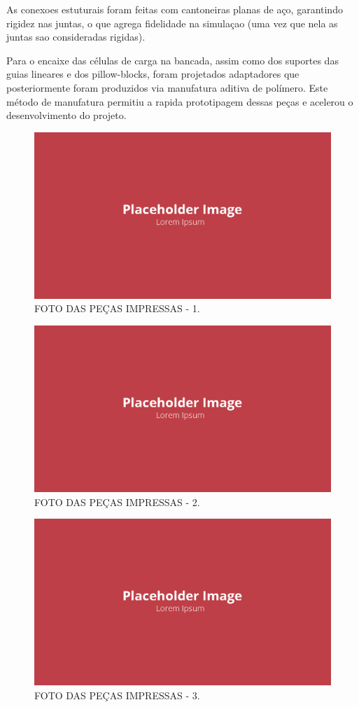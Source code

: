 As conexoes estuturais foram feitas com cantoneiras planas de aço, garantindo rigidez nas juntas, o que agrega fidelidade na simulaçao (uma vez que nela as juntas sao consideradas rigidas).

Para o encaixe das células de carga na bancada, assim como dos suportes das guias lineares e dos pillow-blocks, foram projetados adaptadores que posteriormente foram produzidos via manufatura aditiva de polímero. Este método de manufatura permitiu a rapida prototipagem dessas peças e acelerou o desenvolvimento do projeto.

\begin{figure}[!ht]
    \centering
    \includegraphics[width=.8\linewidth]{figuras/placeholder.png}
    \caption{FOTO DAS PEÇAS IMPRESSAS - 1\cite{autor}.}
    \label{fig:placeholder}
\end{figure}

\begin{figure}[!ht]
    \centering
    \includegraphics[width=.8\linewidth]{figuras/placeholder.png}
    \caption{FOTO DAS PEÇAS IMPRESSAS - 2\cite{autor}.}
    \label{fig:placeholder}
\end{figure}

\begin{figure}[!ht]
    \centering
    \includegraphics[width=.8\linewidth]{figuras/placeholder.png}
    \caption{FOTO DAS PEÇAS IMPRESSAS - 3\cite{autor}.}
    \label{fig:placeholder}
\end{figure}

